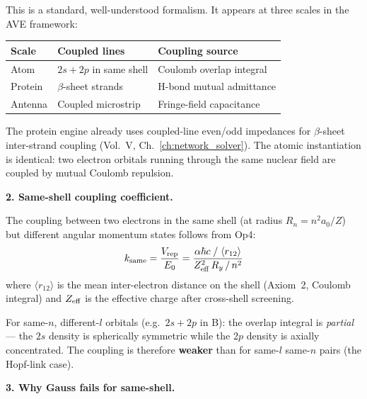 This is a standard, well-understood formalism.
It appears at three scales in the AVE framework:
\begin{center}
\small
\renewcommand{\arraystretch}{1.2}
\begin{tabular}{l l l}
\toprule
\textbf{Scale} &
\textbf{Coupled lines} &
\textbf{Coupling source} \\
\midrule
Atom & $2s + 2p$ in same shell &
    Coulomb overlap integral \\
Protein & $\beta$-sheet strands &
    H-bond mutual admittance \\
Antenna & Coupled microstrip &
    Fringe-field capacitance \\
\bottomrule
\end{tabular}
\end{center}
The protein engine already uses coupled-line
even/odd impedances for $\beta$-sheet inter-strand
coupling (Vol.~V, Ch.~\ref{ch:network_solver}).
The atomic instantiation is identical: two
electron orbitals running through the same
nuclear field are coupled by mutual Coulomb
repulsion.

\noindent\textbf{2. Same-shell coupling coefficient.}

The coupling between two electrons in the same
shell (at radius $R_n = n^2 a_0 / Z$) but different
angular momentum states follows from Op4:
\begin{equation}
    k_{\rm same} = \frac{V_{\rm rep}}{E_0}
    = \frac{\alpha\hbar c \; / \; \langle r_{12} \rangle}
           {Z_{\rm eff}^2 \, R_y \, / \, n^2}
    \label{eq:k_same_shell}
\end{equation}
where $\langle r_{12} \rangle$ is the mean
inter-electron distance on the shell
(Axiom~2, Coulomb integral) and $Z_{\rm eff}$
is the effective charge after cross-shell screening.

For same-$n$, different-$l$ orbitals (e.g.\
$2s + 2p$ in B): the overlap integral is
\emph{partial} --- the $2s$ density is spherically
symmetric while the $2p$ density is axially
concentrated.  The coupling is therefore
\textbf{weaker} than for same-$l$ same-$n$ pairs
(the Hopf-link case).

\noindent\textbf{3. Why Gauss fails for same-shell.}

